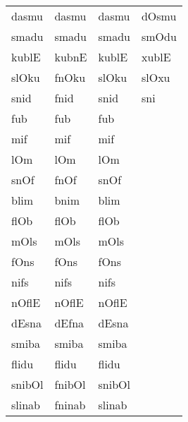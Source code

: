 \documentclass[doc,floatsintext]{apa6}
\begin{document}
\begin{appendix}
\begin{table}[!h]
\begin{tabular}{llll}
dasmu & dasmu & dasmu & dOsmu\\
smadu & smadu & smadu & smOdu\\
kublE & kubnE & kublE & xublE\\
slOku & fnOku & slOku & slOxu\\
snid & fnid & snid & sni\\
fub & fub & fub & \\
mif & mif & mif & \\
lOm & lOm & lOm & \\
snOf & fnOf & snOf & \\
blim & bnim & blim & \\
flOb & flOb & flOb & \\
mOls & mOls & mOls & \\
fOns & fOns & fOns & \\
nifs & nifs & nifs & \\
nOflE & nOflE & nOflE & \\
dEsna & dEfna & dEsna & \\
smiba & smiba & smiba & \\
flidu & flidu & flidu & \\
snibOl & fnibOl & snibOl & \\
slinab & fninab & slinab & \\
\bottomrule
\end{tabular}
\end{table}
\end{appendix}

\clearpage
\end{document}
